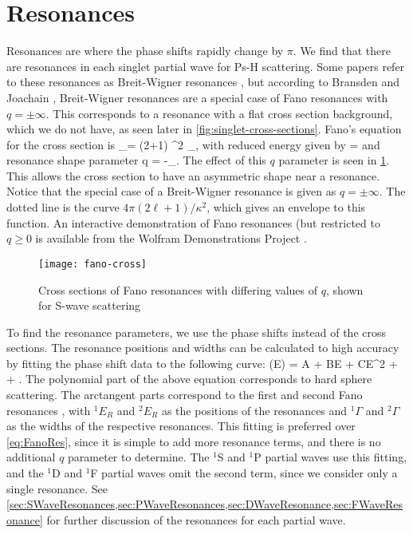\documentclass[Dissertation.tex]{subfiles}
\begin{document}
\section{Resonances}
\label{sec:Resonances}
Resonances are where the phase shifts rapidly change by $\pi$. We find that 
there are resonances in each singlet partial wave for Ps-H scattering. Some 
papers refer to these resonances as Breit-Wigner resonances
\cite{Tennyson1984,Stibbe1998}, but according to Bransden and Joachain
\cite[p.596]{Bransden2003}, Breit-Wigner resonances are a special case of Fano
resonances with $q = \pm\infty$. This corresponds to a resonance with a flat cross section 
background, which we do not have, as seen later in \cref{fig:singlet-cross-sections}.
Fano's equation for the cross section is \cite[p.596]{Bransden2003}
\beq
\label{eq:FanoRes}
\sigma_\ell =  (2\ell+1) \sin^2 \xi_\ell {},
\eeq
with reduced energy given by
\beq
\epsilon = 
\eeq
and resonance shape parameter
\beq
q = -\cot \xi_\ell.
\eeq
The effect of this $q$ parameter is seen in \cref{fig:FanoCross}. This allows 
the cross section to have an asymmetric shape near a resonance. Notice that 
the special case of a Breit-Wigner resonance is given as $q = \pm\infty$. The 
dotted line is the curve $4 \pi (2\ell+1) / \kappa^2$, which gives an 
envelope to this function. An interactive demonstration of Fano resonances
(but restricted to $q \geq 0$ is available from the Wolfram Demonstrations
Project \cite{FanoDemo}.

\begin{figure}[H]
	\centering
	\texttt{[image: fano-cross]}
	\caption[Cross sections of Fano resonances]{Cross sections of Fano 
resonances with differing values of $q$, shown for S-wave scattering}
	\label{fig:FanoCross}
\end{figure}

To find the resonance parameters, we use the phase shifts instead of the 
cross sections. The resonance positions and widths can be calculated to high 
accuracy by fitting the phase shift data to the following curve:
\beq
\label{eq:ResonanceCurve}
\delta(E) = A + BE + CE^2 + \arctan{}
  + \arctan{}.
\eeq
The polynomial part of the above equation corresponds to hard sphere 
scattering. The arctangent parts correspond to the first and second Fano 
resonances \cite{Fano1961,Macek1970,Hazi1979}, with $^1E_R$ and $^2E_R$ as 
the positions of the resonances and $^1\Gamma$ and $^2\Gamma$ as the widths 
of the respective resonances. This fitting is preferred over \cref{eq:FanoRes},
since it is simple to add more resonance terms, and there is no additional
$q$ parameter to determine. The $^1$S and $^1$P partial waves use this 
fitting, and the $^1$D and $^1$F partial waves omit the second term, since we 
consider only a single resonance. See
\cref{sec:SWaveResonances,sec:PWaveResonances,sec:DWaveResonance,sec:FWaveResonance}
for further discussion of the resonances for each partial wave.
\end{document}
